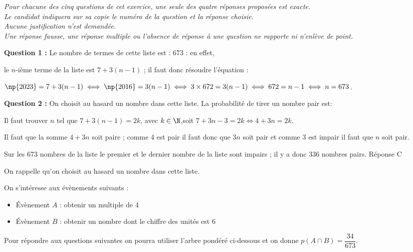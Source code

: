 \medskip

\emph{Pour chacune des cinq questions de cet exercice, une seule des quatre réponses proposées est exacte.\\Le candidat indiquera sur sa copie le numéro de la question et la réponse choisie.\\
Aucune justification n'est demandée.\\
Une réponse fausse, une réponse multiple ou l'absence de réponse à une question ne rapporte ni n'enlève de point.}

\medskip





\textbf{Question 1 :} Le nombre de termes de cette liste est : 673 : en effet,

le $n$-ième terme de la liste est $7 + 3(n - 1)$ ; il faut donc résoudre l'équation :

$\np{2023} = 7 + 3(n - 1) \iff \np{2016} = 3(n - 1) \iff 3 \times 672 = 3(n - 1) \iff 672 = n - 1 \iff n = 673$.








\textbf{Question 2 :} On choisit au hasard un nombre dans cette liste. La probabilité de tirer un nombre pair est:







Il faut trouver $n$ tel que $7 + 3(n - 1) = 2k$, avec $k \in \N$,soit $7 + 3n - 3 = 2k \iff 4 + 3n = 2k$.

Il faut que la somme $4 + 3n$ soit paire ; comme 4 est pair il faut donc que $3n$ soit pair et comme 3 est impair il faut que $n$ soit pair.

Sur les 673 nombres de la liste le premier et le dernier nombre de la liste sont impairs ; il y a donc 336 nombres pairs. Réponse C
\medskip

On rappelle qu'on choisit au hasard un nombre dans cette liste. 

On s'intéresse aux évènements suivants :
\begin{itemize}
\item[$\bullet~~$]Évènement $A$ : \og obtenir un multiple de 4 \fg
\item[$\bullet~~$]Évènement $B$ : \og obtenir un nombre dont le chiffre des unités est 6 \fg
\end{itemize}

Pour répondre aux questions suivantes on pourra utiliser l'arbre pondéré ci-dessous et on donne
$p(A \cap B) = \dfrac{34}{673}$.

